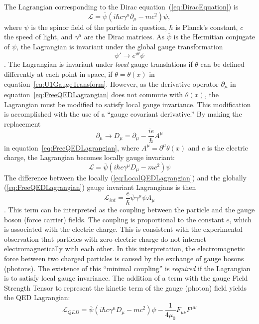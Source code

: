The Lagrangian corresponding to the Dirac equation~(\ref{eq:DiracEquation}) is
\begin{equation}
  \mathcal{L} = \overline \psi (i\hbar c\gamma^\mu \partial_\mu - mc^2) \psi,
  \label{eq:FreeQEDLagrangian}
\end{equation}
where $\psi$ is the spinor field of the particle in question, $\hbar$ is Planck's
constant, $c$ the speed of light, and $\gamma^\mu$ are the Dirac matrices.  As
$\overline\psi$ is the Hermitian conjugate of $\psi$, the Lagrangian is invariant
under the global gauge transformation 
\begin{equation}
  \psi' \to e^{i\theta}\psi
  \label{eq:U1GaugeTransform}
\end{equation}.
The Lagrangian is invariant under \emph{local} gauge translations if $\theta$
can be defined differently at each point in space, \ie if $\theta = \theta(x)$
in equation~\ref{eq:U1GaugeTransform}.  However, as the derivative operator
$\partial_\mu$ in equation~\ref{eq:FreeQEDLagrangian} does not commute with
$\theta(x)$, the Lagrangian must be modified to satisfy local gauge invariance.
This modification is accomplished with the use of a ``gauge covariant
derivative.''  By making the replacement 
\begin{equation} 
  \partial_\mu \to D_\mu = \partial_\mu - \frac{ie}{\hbar}A^\mu      
\end{equation}
in equation~\ref{eq:FreeQEDLagrangian}, where 
$A^\mu = \partial^\mu \theta(x)$ and $e$ is the electric charge, the Lagrangian
becomes locally gauge invariant:
\begin{equation}
  \mathcal{L} = \overline \psi (i\hbar c\gamma^\mu D_\mu - mc^2) \psi 
  \label{eq:LocalQEDLagrangian}
\end{equation}
The difference between
the locally (\ref{eq:LocalQEDLagrangian}) and the globally 
(\ref{eq:FreeQEDLagrangian}) gauge invariant Lagrangians is then
\begin{equation}
  \mathcal{L}_{int} = \frac{e}{\hbar}\overline\psi\gamma^\mu\psi A_\mu 
\end{equation}.
This term can be interpreted as the coupling between the particle and the gauge
boson (force carrier) fields.  The coupling is proportional to the constant $e$,
which is associated with the electric charge.  This is consistent with the
experimental observation that particles with zero electric charge do not
interact electromagnetically with each other.  In this interpretation, the
electromagnetic force between two charged particles is caused by the exchange of
gauge bosons (photons).  The existence of this ``minimal coupling'' is
\emph{required} if the Lagrangian is to satisfy local gauge invariance. The
addition of a term with the gauge Field Strength Tensor to represent the kinetic
term of the gauge (photon) field yields the QED Lagrangian:
\begin{equation}
  \mathcal{L}_{QED} = \overline \psi (i\hbar c\gamma^\mu D_\mu - mc^2) \psi -
  \frac{1}{4\mu_0}F_{\mu\nu}F^{\mu\nu}
\end{equation}

